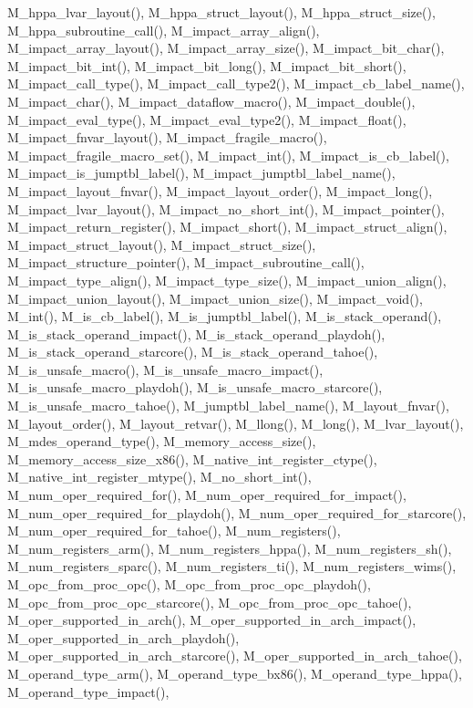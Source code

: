 M\_\-hppa\_\-lvar\_\-layout(), M\_\-hppa\_\-struct\_\-layout(), M\_\-hppa\_\-struct\_\-size(), M\_\-hppa\_\-subroutine\_\-call(), M\_\-impact\_\-array\_\-align(), M\_\-impact\_\-array\_\-layout(), M\_\-impact\_\-array\_\-size(), M\_\-impact\_\-bit\_\-char(), M\_\-impact\_\-bit\_\-int(), M\_\-impact\_\-bit\_\-long(), M\_\-impact\_\-bit\_\-short(), M\_\-impact\_\-call\_\-type(), M\_\-impact\_\-call\_\-type2(), M\_\-impact\_\-cb\_\-label\_\-name(), M\_\-impact\_\-char(), M\_\-impact\_\-dataflow\_\-macro(), M\_\-impact\_\-double(), M\_\-impact\_\-eval\_\-type(), M\_\-impact\_\-eval\_\-type2(), M\_\-impact\_\-float(), M\_\-impact\_\-fnvar\_\-layout(), M\_\-impact\_\-fragile\_\-macro(), M\_\-impact\_\-fragile\_\-macro\_\-set(), M\_\-impact\_\-int(), M\_\-impact\_\-is\_\-cb\_\-label(), M\_\-impact\_\-is\_\-jumptbl\_\-label(), M\_\-impact\_\-jumptbl\_\-label\_\-name(), M\_\-impact\_\-layout\_\-fnvar(), M\_\-impact\_\-layout\_\-order(), M\_\-impact\_\-long(), M\_\-impact\_\-lvar\_\-layout(), M\_\-impact\_\-no\_\-short\_\-int(), M\_\-impact\_\-pointer(), M\_\-impact\_\-return\_\-register(), M\_\-impact\_\-short(), M\_\-impact\_\-struct\_\-align(), M\_\-impact\_\-struct\_\-layout(), M\_\-impact\_\-struct\_\-size(), M\_\-impact\_\-structure\_\-pointer(), M\_\-impact\_\-subroutine\_\-call(), M\_\-impact\_\-type\_\-align(), M\_\-impact\_\-type\_\-size(), M\_\-impact\_\-union\_\-align(), M\_\-impact\_\-union\_\-layout(), M\_\-impact\_\-union\_\-size(), M\_\-impact\_\-void(), M\_\-int(), M\_\-is\_\-cb\_\-label(), M\_\-is\_\-jumptbl\_\-label(), M\_\-is\_\-stack\_\-operand(), M\_\-is\_\-stack\_\-operand\_\-impact(), M\_\-is\_\-stack\_\-operand\_\-playdoh(), M\_\-is\_\-stack\_\-operand\_\-starcore(), M\_\-is\_\-stack\_\-operand\_\-tahoe(), M\_\-is\_\-unsafe\_\-macro(), M\_\-is\_\-unsafe\_\-macro\_\-impact(), M\_\-is\_\-unsafe\_\-macro\_\-playdoh(), M\_\-is\_\-unsafe\_\-macro\_\-starcore(), M\_\-is\_\-unsafe\_\-macro\_\-tahoe(), M\_\-jumptbl\_\-label\_\-name(), M\_\-layout\_\-fnvar(), M\_\-layout\_\-order(), M\_\-layout\_\-retvar(), M\_\-llong(), M\_\-long(), M\_\-lvar\_\-layout(), M\_\-mdes\_\-operand\_\-type(), M\_\-memory\_\-access\_\-size(), M\_\-memory\_\-access\_\-size\_\-x86(), M\_\-native\_\-int\_\-register\_\-ctype(), M\_\-native\_\-int\_\-register\_\-mtype(), M\_\-no\_\-short\_\-int(), M\_\-num\_\-oper\_\-required\_\-for(), M\_\-num\_\-oper\_\-required\_\-for\_\-impact(), M\_\-num\_\-oper\_\-required\_\-for\_\-playdoh(), M\_\-num\_\-oper\_\-required\_\-for\_\-starcore(), M\_\-num\_\-oper\_\-required\_\-for\_\-tahoe(), M\_\-num\_\-registers(), M\_\-num\_\-registers\_\-arm(), M\_\-num\_\-registers\_\-hppa(), M\_\-num\_\-registers\_\-sh(), M\_\-num\_\-registers\_\-sparc(), M\_\-num\_\-registers\_\-ti(), M\_\-num\_\-registers\_\-wims(), M\_\-opc\_\-from\_\-proc\_\-opc(), M\_\-opc\_\-from\_\-proc\_\-opc\_\-playdoh(), M\_\-opc\_\-from\_\-proc\_\-opc\_\-starcore(), M\_\-opc\_\-from\_\-proc\_\-opc\_\-tahoe(), M\_\-oper\_\-supported\_\-in\_\-arch(), M\_\-oper\_\-supported\_\-in\_\-arch\_\-impact(), M\_\-oper\_\-supported\_\-in\_\-arch\_\-playdoh(), M\_\-oper\_\-supported\_\-in\_\-arch\_\-starcore(), M\_\-oper\_\-supported\_\-in\_\-arch\_\-tahoe(), M\_\-operand\_\-type\_\-arm(), M\_\-operand\_\-type\_\-bx86(), M\_\-operand\_\-type\_\-hppa(), M\_\-operand\_\-type\_\-impact(), 